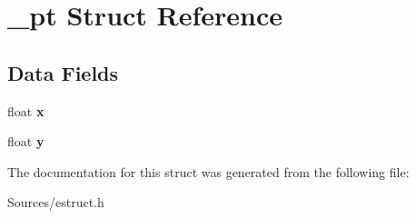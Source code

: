 \hypertarget{struct__pt}{\section{\-\_\-pt Struct Reference}
\label{struct__pt}
}
\subsection*{Data Fields}
\begin{DoxyCompactItemize}
\item 
\hypertarget{struct__pt_ad0da36b2558901e21e7a30f6c227a45e}{float {\bfseries x}}\label{struct__pt_ad0da36b2558901e21e7a30f6c227a45e}

\item 
\hypertarget{struct__pt_aa4f0d3eebc3c443f9be81bf48561a217}{float {\bfseries y}}\label{struct__pt_aa4f0d3eebc3c443f9be81bf48561a217}

\end{DoxyCompactItemize}


The documentation for this struct was generated from the following file\-:\begin{DoxyCompactItemize}
\item 
Sources/estruct.\-h\end{DoxyCompactItemize}
